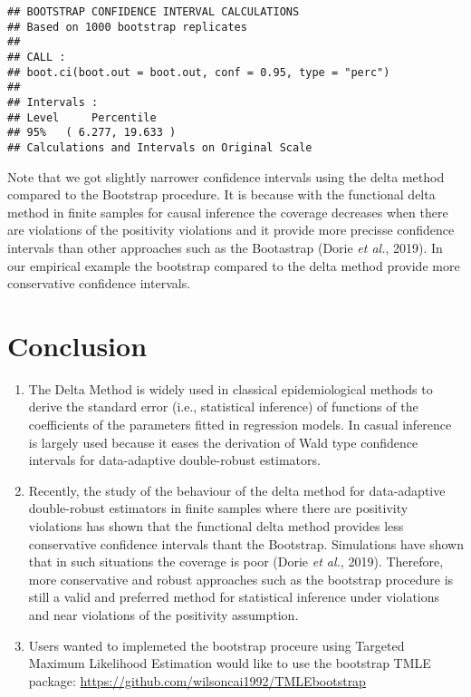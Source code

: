 \documentclass[
]{article}
\providecommand{\tightlist}{%
  \setlength{\itemsep}{0pt}\setlength{\parskip}{0pt}}
\begin{document}
\begin{verbatim}
## BOOTSTRAP CONFIDENCE INTERVAL CALCULATIONS
## Based on 1000 bootstrap replicates
## 
## CALL : 
## boot.ci(boot.out = boot.out, conf = 0.95, type = "perc")
## 
## Intervals : 
## Level     Percentile     
## 95%   ( 6.277, 19.633 )  
## Calculations and Intervals on Original Scale
\end{verbatim}

Note that we got slightly narrower confidence intervals using the delta
method compared to the Bootstrap procedure. It is because with the
functional delta method in finite samples for causal inference the
coverage decreases when there are violations of the positivity
violations and it provide more precisse confidence intervals than other
approaches such as the Bootastrap (Dorie \emph{et al.}, 2019). In our
empirical example the bootstrap compared to the delta method provide
more conservative confidence intervals.

\hypertarget{conclusion}{%
\section{Conclusion}\label{conclusion}}

\begin{enumerate}
\def\labelenumi{\arabic{enumi}.}
\tightlist
\item
  The Delta Method is widely used in classical epidemiological methods
  to derive the standard error (i.e., statistical inference) of
  functions of the coefficients of the parameters fitted in regression
  models. In casual inference is largely used because it eases the
  derivation of Wald type confidence intervals for data-adaptive
  double-robust estimators.
\item
  Recently, the study of the behaviour of the delta method for
  data-adaptive double-robust estimators in finite samples where there
  are positivity violations has shown that the functional delta method
  provides less conservative confidence intervals thant the Bootstrap.
  Simulations have shown that in such situations the coverage is poor
  (Dorie \emph{et al.}, 2019). Therefore, more conservative and robust
  approaches such as the bootstrap procedure is still a valid and
  preferred method for statistical inference under violations and near
  violations of the positivity assumption.
\item
  Users wanted to implemeted the bootstrap proceure using Targeted
  Maximum Likelihood Estimation would like to use the bootstrap TMLE
  package: \url{https://github.com/wilsoncai1992/TMLEbootstrap}
\end{enumerate}
\end{document}
